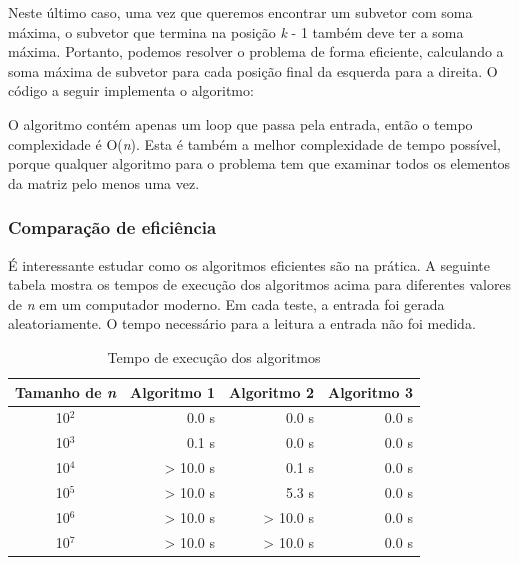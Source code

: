 Neste último caso, uma vez que queremos encontrar um subvetor com soma máxima, o subvetor que termina na posição \textit{k} - 1 também deve ter a soma máxima. Portanto, podemos resolver o problema de forma eficiente, calculando a soma máxima de subvetor para cada posição final da esquerda para a direita. O código a seguir implementa o algoritmo:


      

O algoritmo contém apenas um loop que passa pela entrada, então o tempo complexidade é O(\textit{n}). Esta é também a melhor complexidade de tempo possível, porque qualquer algoritmo para o problema tem que examinar todos os elementos da matriz pelo menos uma vez.

\subsubsection{Comparação de eficiência}

É interessante estudar como os algoritmos eficientes são na prática. A seguinte tabela mostra os tempos de execução dos algoritmos acima para diferentes valores de \textit{n} em um computador moderno. Em cada teste, a entrada foi gerada aleatoriamente. O tempo necessário para a leitura a entrada não foi medida.

\begin{table}[H]
   \begin{center}
        \begin{tabular}{crrr}
            \textbf{Tamanho de \textit{n}} & \textbf{Algoritmo 1} & \textbf{Algoritmo 2} & \textbf{Algoritmo 3}\\ 
            \hline
            10$^2$ &   0.0 s & 0.0 s & 0.0 s \\
            10$^3$ &   0.1 s & 0.0 s & 0.0 s \\
            10$^4$ & > 10.0 s & 0.1 s & 0.0 s \\
            10$^5$ & > 10.0 s & 5.3 s & 0.0 s \\
            10$^6$ & > 10.0 s & > 10.0 s & 0.0 s \\
            10$^7$ & > 10.0 s & > 10.0 s & 0.0 s \\
            \hline
        \end{tabular}
         \caption{Tempo de execução dos algoritmos}
         \label{tab:complexidade}
    \end{center}
\end{table}

